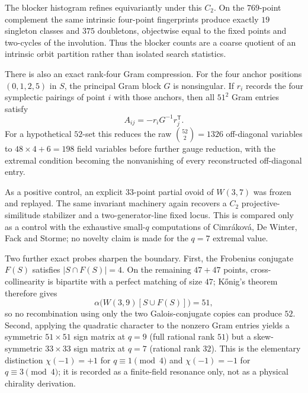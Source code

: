 The blocker histogram refines equivariantly under this $C_2$.  On the $769$-point complement the same intrinsic four-point fingerprints produce exactly $19$ singleton classes and $375$ doubletons, objectwise equal to the fixed points and two-cycles of the involution.  Thus the blocker counts are a coarse quotient of an intrinsic orbit partition rather than isolated search statistics.

There is also an exact rank-four Gram compression.  For the four anchor positions $(0,1,2,5)$ in $S$, the principal Gram block $G$ is nonsingular.  If $r_i$ records the four symplectic pairings of point $i$ with those anchors, then all $51^2$ Gram entries satisfy
\[
 A_{ij}=-r_iG^{-1}r_j^{\mathsf T}.
\]
For a hypothetical $52$-set this reduces the raw $\binom{52}{2}=1326$ off-diagonal variables to $48\times4+6=198$ field variables before further gauge reduction, with the extremal condition becoming the nonvanishing of every reconstructed off-diagonal entry.

As a positive control, an explicit $33$-point partial ovoid of $W(3,7)$ was frozen and replayed.  The same invariant machinery again recovers a $C_2$ projective-similitude stabilizer and a two-generator-line fixed locus.  This is compared only as a control with the exhaustive small-$q$ computations of Cimr\'akov\'a, De Winter, Fack and Storme; no novelty claim is made for the $q=7$ extremal value.

Two further exact probes sharpen the boundary.  First, the Frobenius conjugate $F(S)$ satisfies $|S\cap F(S)|=4$.  On the remaining $47+47$ points, cross-collinearity is bipartite with a perfect matching of size $47$; K\H{o}nig's theorem therefore gives
\[
 \alpha\bigl(W(3,9)[S\cup F(S)]\bigr)=51,
\]
so no recombination using only the two Galois-conjugate copies can produce $52$.  Second, applying the quadratic character to the nonzero Gram entries yields a symmetric $51\times51$ sign matrix at $q=9$ (full rational rank $51$) but a skew-symmetric $33\times33$ sign matrix at $q=7$ (rational rank $32$).  This is the elementary distinction $\chi(-1)=+1$ for $q\equiv1\pmod4$ and $\chi(-1)=-1$ for $q\equiv3\pmod4$; it is recorded as a finite-field resonance only, not as a physical chirality derivation.
